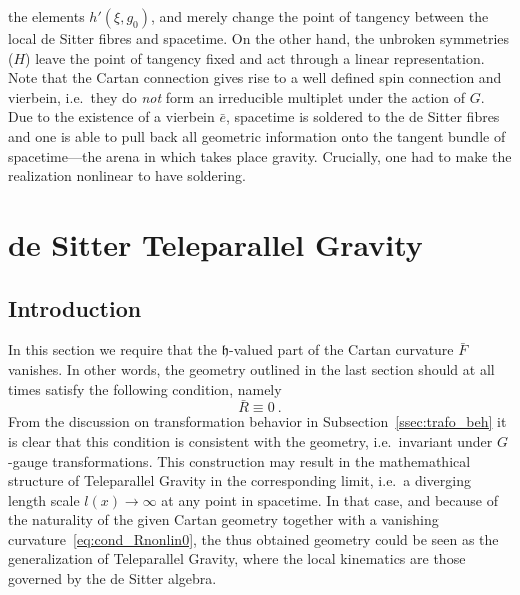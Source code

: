 \documentclass[11pt]{article}
\begin{document}
the elements $h'(\xi,g_0)$, and merely change the point of 
tangency between the local de Sitter fibres and spacetime. On the 
other hand, the unbroken symmetries ($H$) leave the point of 
tangency fixed and act through a linear representation.
Note that the Cartan connection gives rise to a well defined spin 
connection and vierbein, i.e.~they do \emph{not} form an 
irreducible multiplet under the action of $G$. Due to the 
existence of a vierbein $\bar{e}$, spacetime is soldered to the 
de Sitter fibres and one is able to pull back all geometric 
information onto the tangent bundle of spacetime---the arena in 
which takes place gravity. Crucially, one had to make the 
realization nonlinear to have soldering.

\section{de Sitter Teleparallel Gravity}

\subsection{Introduction}

In this section we require that the $\mathfrak{h}$-valued part of 
the Cartan curvature $\bar{F}$ vanishes. In other words, the 
geometry outlined in the last section should at all times satisfy 
the following condition, namely
\begin{equation}
	\label{eq:cond_Rnonlin0}
	\bar{R} \equiv 0~.
\end{equation}
From the discussion on transformation behavior in 
Subsection~\ref{ssec:trafo_beh} it is clear that this condition 
is consistent with the geometry, i.e.~invariant under $G$-gauge 
transformations. This construction may result in the 
mathemathical structure of Teleparallel Gravity in the 
corresponding limit, i.e.~a diverging length scale $l(x) \to 
\infty$ at any point in spacetime. In that case, and because of 
the naturality of the given Cartan geometry together with a 
vanishing curvature~\eqref{eq:cond_Rnonlin0}, the thus obtained 
geometry could be seen as the generalization of Teleparallel 
Gravity, where the local kinematics are those governed by the de 
Sitter algebra.
\end{document}
